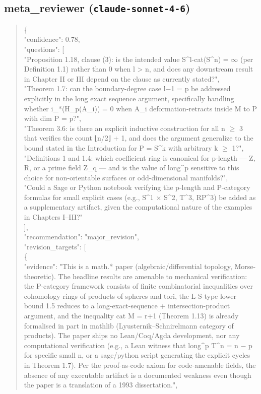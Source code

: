 \documentclass[11pt]{article}
\begin{document}
\subsection*{meta\_reviewer (\texttt{claude-sonnet-4-6})}
\begin{quote}\small\ttfamily\raggedright
\{\\
  "confidence": 0.78,\\
  "questions": [\\
    "Proposition 1.18, clause (3): is the intended value S\^{}l-cat(S\^{}n) = \ensuremath{\infty} (per Definition 1.1) rather than 0 when l > n, and does any downstream result in Chapter II or III depend on the clause as currently stated?",\\
    "Theorem 1.7: can the boundary-degree case l\ensuremath{-}1 = p be addressed explicitly in the long exact sequence argument, specifically handling whether i\_*(H\_p(A\_i)) = 0 when A\_i deformation-retracts inside M to P with dim P = p?",\\
    "Theorem 3.6: is there an explicit inductive construction for all n \ensuremath{\ge} 3 that verifies the count ⌊n/2⌋ + 1, and does the argument generalize to the bound stated in the Introduction for P = S\^{}k with arbitrary k \ensuremath{\ge} 1?",\\
    "Definitions 1 and 1.4: which coefficient ring is canonical for p-length --- Z, R, or a prime field Z\_q --- and is the value of long\^{}p sensitive to this choice for non-orientable surfaces or odd-dimensional manifolds?",\\
    "Could a Sage or Python notebook verifying the p-length and P-category formulas for small explicit cases (e.g., S\^{}1 \ensuremath{\times} S\^{}2, T\^{}3, RP\^{}3) be added as a supplementary artifact, given the computational nature of the examples in Chapters I--III?"\\
  ],\\
  "recommendation": "major\_revision",\\
  "revision\_targets": [\\
    \{\\
      "evidence": "This is a math.* paper (algebraic/differential topology, Morse-theoretic). The headline results are amenable to mechanical verification: the P-category framework consists of finite combinatorial inequalities over cohomology rings of products of spheres and tori, the L-S-type lower bound 1.5 reduces to a long-exact-sequence + intersection-product argument, and the inequality cat M = r+1 (Theorem 1.13) is already formalised in part in mathlib (Lyusternik--Schnirelmann category of products). The paper ships no Lean/Coq/Agda development, nor any computational verification (e.g., a Lean witness that long\^{}p T\^{}n = n \ensuremath{-} p for specific small n, or a sage/python script generating the explicit cycles in Theorem 1.7). Per the proof-as-code axiom for code-amenable fields, the absence of any executable artifact is a documented weakness even though the paper is a translation of a 1993 dissertation.",\\

\end{quote}
\end{document}
